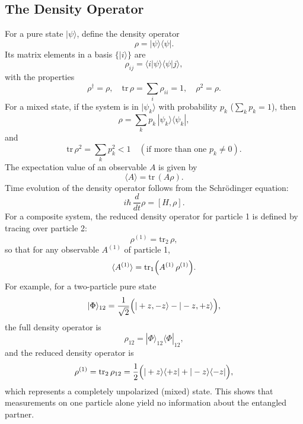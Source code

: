\documentclass[twocolumn]{article}
\begin{document}
\begin{spacing}{1}
\subsection{The Density Operator}
For a pure state \(|\psi\rangle\), define the density operator
\[
\rho=|\psi\rangle\langle\psi|.
\]
Its matrix elements in a basis \(\{|i\rangle\}\) are
\[
\rho_{ij}=\langle i|\psi\rangle\langle\psi|j\rangle,
\]
with the properties
\[
\rho^\dagger=\rho,\quad \mathrm{tr}\,\rho=\sum_i \rho_{ii}=1,\quad \rho^2=\rho.
\]
For a mixed state, if the system is in \(|\psi_k\rangle\) with probability \(p_k\) (\(\sum_k p_k=1\)), then
\[
\rho=\sum_k p_k\,|\psi_k\rangle\langle\psi_k|,
\]
and
\[
\mathrm{tr}\,\rho^2=\sum_k p_k^2<1\quad (\text{if more than one } p_k\neq0).
\]
The expectation value of an observable \(A\) is given by
\[
\langle A\rangle = \mathrm{tr}\,(A\rho).
\]
Time evolution of the density operator follows from the Schrödinger equation:
\[
i\hbar\,\frac{d}{dt}\rho=[H,\rho].
\]
For a composite system, the reduced density operator for particle 1 is defined by tracing over particle 2:
\[
\rho^{(1)}=\mathrm{tr}_2\,\rho,
\]
so that for any observable \(A^{(1)}\) of particle 1,
\[
\langle A^{(1)}\rangle = \mathrm{tr}_1\Bigl(A^{(1)}\,\rho^{(1)}\Bigr).
\]
For example, for a two-particle pure state
\[
|\Phi\rangle_{12} = \frac{1}{\sqrt{2}}\Bigl(|+z,-z\rangle - |-z,+z\rangle\Bigr),
\]
the full density operator is
\[
\rho_{12}=|\Phi\rangle_{12}\langle\Phi|_{12},
\]
and the reduced density operator is
\[
\rho^{(1)}=\mathrm{tr}_2\,\rho_{12}=\frac{1}{2}\Bigl(|+z\rangle\langle+z|+|-z\rangle\langle-z|\Bigr),
\]
which represents a completely unpolarized (mixed) state. This shows that measurements on one particle alone yield no information about the entangled partner.


\end{spacing}
\end{document}
